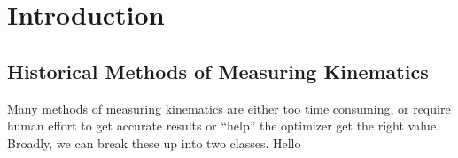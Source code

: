 \chapter{Introduction}



\section{Historical Methods of Measuring Kinematics}
Many methods of measuring kinematics are either too time consuming, or require human effort to get accurate results or ``help'' the optimizer get the right value. Broadly, we can break these up into two classes. Hello